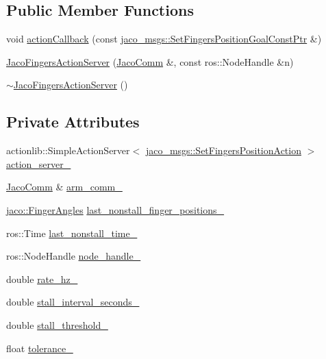 \subsection*{Public Member Functions}
\begin{DoxyCompactItemize}
\item 
void \hyperlink{classjaco_1_1JacoFingersActionServer_a642f494b27d513457e9f29de7a4b31b6}{action\+Callback} (const \hyperlink{namespacejaco__msgs_a4432ef01b2858fafbc445a38e7c6dcba}{jaco\+\_\+msgs\+::\+Set\+Fingers\+Position\+Goal\+Const\+Ptr} \&)
\item 
\hyperlink{classjaco_1_1JacoFingersActionServer_aae225d4ab0745de98795cf7af2132d0c}{Jaco\+Fingers\+Action\+Server} (\hyperlink{classjaco_1_1JacoComm}{Jaco\+Comm} \&, const ros\+::\+Node\+Handle \&n)
\item 
\hyperlink{classjaco_1_1JacoFingersActionServer_a0497dec496f6224031096e5f6735e9c8}{$\sim$\+Jaco\+Fingers\+Action\+Server} ()
\end{DoxyCompactItemize}
\subsection*{Private Attributes}
\begin{DoxyCompactItemize}
\item 
actionlib\+::\+Simple\+Action\+Server$<$ \hyperlink{namespacejaco__msgs_a6a86f786fe9f2e29693a22cec953c58c}{jaco\+\_\+msgs\+::\+Set\+Fingers\+Position\+Action} $>$ \hyperlink{classjaco_1_1JacoFingersActionServer_a34f6a67ccd8fe1ad2bc75873d20da0f1}{action\+\_\+server\+\_\+}
\item 
\hyperlink{classjaco_1_1JacoComm}{Jaco\+Comm} \& \hyperlink{classjaco_1_1JacoFingersActionServer_afbddf1665a5e66b79cc79cae0b2badeb}{arm\+\_\+comm\+\_\+}
\item 
\hyperlink{classjaco_1_1FingerAngles}{jaco\+::\+Finger\+Angles} \hyperlink{classjaco_1_1JacoFingersActionServer_a77586bea5c075f6439f6dc3858513e46}{last\+\_\+nonstall\+\_\+finger\+\_\+positions\+\_\+}
\item 
ros\+::\+Time \hyperlink{classjaco_1_1JacoFingersActionServer_ad9ee1e4c978970bdfac066f6dc9c4316}{last\+\_\+nonstall\+\_\+time\+\_\+}
\item 
ros\+::\+Node\+Handle \hyperlink{classjaco_1_1JacoFingersActionServer_a7cdaaf5a70f820aeef87a18fe24ff5ec}{node\+\_\+handle\+\_\+}
\item 
double \hyperlink{classjaco_1_1JacoFingersActionServer_a402a46cdd8ce3ac114cdd9f6e048f0e2}{rate\+\_\+hz\+\_\+}
\item 
double \hyperlink{classjaco_1_1JacoFingersActionServer_abd1f212225ef99b5880753f5c9261976}{stall\+\_\+interval\+\_\+seconds\+\_\+}
\item 
double \hyperlink{classjaco_1_1JacoFingersActionServer_a809ce35a92032be0b9e768fc29fd2cbf}{stall\+\_\+threshold\+\_\+}
\item 
float \hyperlink{classjaco_1_1JacoFingersActionServer_ad02d71429e1d137cb9fbd47cef703737}{tolerance\+\_\+}
\end{DoxyCompactItemize}


